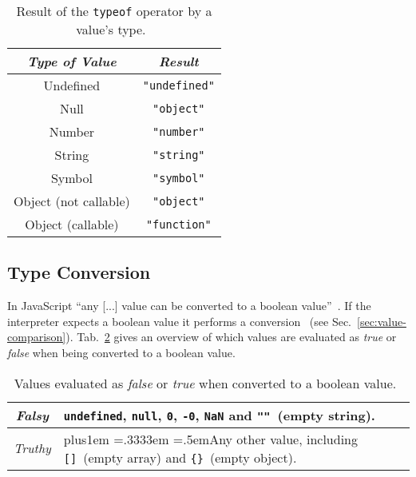 \begin{table}[h]
\caption{Result of the \texttt{typeof} operator by a value's type.~\cite[p.~164]{ES6Spec:Ecma:2015}}
\label{tab:typeof}
\centering
  \setlength{\tabcolsep}{5mm}
  \def\arraystretch{1.25}
  \small
  \begin{tabular}{|c|c|}
    \hline
    \emph{Type of Value} & \emph{Result} \\
    \hline \hline
    Undefined & \texttt{"undefined"} \\
    \hline
    Null & \texttt{"object"} \\
    \hline
    Number & \texttt{"number"} \\
    \hline
    String & \texttt{"string"} \\
    \hline
    Symbol & \texttt{"symbol"} \\
    \hline
    Object (not callable) & \texttt{"object"} \\
    \hline
    Object (callable) & \texttt{"function"} \\
    \hline
  \end{tabular}
\end{table}

\subsection{Type Conversion}
\label{sec:type-conversion}

In JavaScript ``any [...] value can be converted to a boolean value''~\cite[p.~40]{JavaScriptTheDefinitiveGuide:Flanagan:2011}. If the interpreter expects a boolean value it performs a conversion~\cite[p.~46]{JavaScriptTheDefinitiveGuide:Flanagan:2011} (see Sec.~\ref{sec:value-comparison}). Tab.~\ref{tab:truthy-falsy} gives an overview of which values are evaluated as \emph{true} or \emph{false} when being converted to a boolean value.

\begin{table}[h]
\caption{Values evaluated as \emph{false} or \emph{true} when converted to a boolean value.~\cite[p.~40]{JavaScriptTheDefinitiveGuide:Flanagan:2011}}
\label{tab:truthy-falsy}
\centering
  \def\rr{\rightskip=0pt plus1em \spaceskip=.3333em \xspaceskip=.5em\relax}
  \setlength{\tabcolsep}{1ex}
  \def\arraystretch{1.20}
  \setlength{\tabcolsep}{1ex}
  \small
  \begin{tabular}{|c||l|}
    \hline
    \emph{Falsy} & \texttt{undefined}, \texttt{null}, \texttt{0}, \texttt{-0}, \texttt{NaN} and \texttt{""}~(empty string). \\
    \hline
    \emph{Truthy} & {\rr Any other value, including \texttt{[]}~(empty array) and \texttt{\{\}}~(empty object). } \\
    \hline
  \end{tabular}
\end{table}


